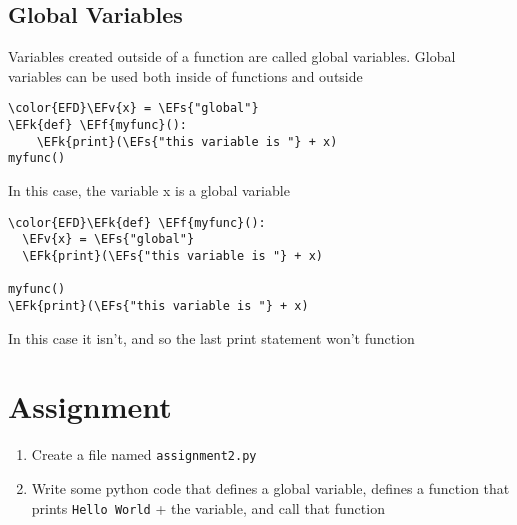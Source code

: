 \documentclass{scrartcl}
\newcommand{\EFk}[1]{\textcolor{EFk}{#1}} %
\newcommand{\EFs}[1]{\textcolor{EFs}{#1}} %
\newcommand{\EFv}[1]{\textcolor{EFv}{#1}} %
\newcommand{\EFf}[1]{\textcolor{EFf}{#1}} %
\begin{document}
\subsection{Global Variables}
\label{sec:org675db7d}
Variables created outside of a function are called global variables. Global
variables can be used both inside of functions and outside
\begin{Code}
\begin{Verbatim}[]
\color{EFD}\EFv{x} = \EFs{"global"}
\EFk{def} \EFf{myfunc}():
    \EFk{print}(\EFs{"this variable is "} + x)
myfunc()
\end{Verbatim}
\end{Code}
In this case, the variable x is a global variable
\begin{Code}
\begin{Verbatim}[]
\color{EFD}\EFk{def} \EFf{myfunc}():
  \EFv{x} = \EFs{"global"}
  \EFk{print}(\EFs{"this variable is "} + x)

myfunc()
\EFk{print}(\EFs{"this variable is "} + x)
\end{Verbatim}
\end{Code}
In this case it isn't, and so the last print statement won't function

\section{Assignment}
\label{sec:orgadb412f}
\begin{enumerate}
\item Create a file named \texttt{assignment2.py}
\item Write some python code that defines a global variable, defines a function
that prints \texttt{Hello World} + the variable, and call that function
\end{enumerate}
\end{document}

